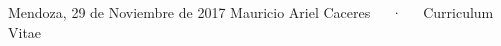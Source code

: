 \documentclass[11pt, a4paper]{awesome-cv}
\begin{document}

\makecvheader[R]

\makecvfooter
   {Mendoza, 29 de Noviembre de 2017}
  {Mauricio Ariel Caceres~~~·~~~Curriculum Vitae}
  {\thepage}
	






%
%
%


\end{document}
